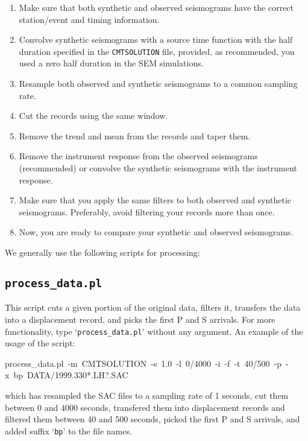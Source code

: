 \begin{enumerate}
\item Make sure that both synthetic and observed seismograms have the correct station/event and timing information.
\item Convolve synthetic seismograms with a source time function with the half duration specified in the \texttt{CMTSOLUTION} file, provided, as recommended, you used a zero half duration in the SEM simulations.
\item Resample both observed and synthetic seismograms to a common sampling rate.
\item Cut the records using the same window.
\item Remove the trend and mean from the records and taper them.
\item Remove the instrument response from the observed seismograms (recommended) or convolve the synthetic seismograms with the instrument response.
\item Make sure that you apply the same filters to both observed and synthetic seismograms. Preferably, avoid filtering your records more than once.
\item Now, you are ready to compare your synthetic and observed seismograms.
\end{enumerate}

We generally use the following scripts for processing:

\subsection{\texttt{process\_data.pl}}

This script cuts a given portion of the original data, filters it,
transfers the data into a displacement record, and picks the first
P and S arrivals. For more functionality, type `\texttt{process\_data.pl}'
without any argument. An example of the usage of the script:

\begin{lyxcode}
{\footnotesize process\_data.pl~-m~CMTSOLUTION~-s~1.0~-l~0/4000~-i~-f~-t~40/500~-p~-x~bp~DATA/1999.330{*}.LH?.SAC}{\footnotesize \par}
\end{lyxcode}

\noindent which has resampled the SAC files to a sampling rate of 1 seconds, cut them between 0 and 4000 seconds, transfered them into displacement
records and filtered them between 40 and 500 seconds, picked the first P and S arrivals, and added suffix `\texttt{bp}' to the file names.

